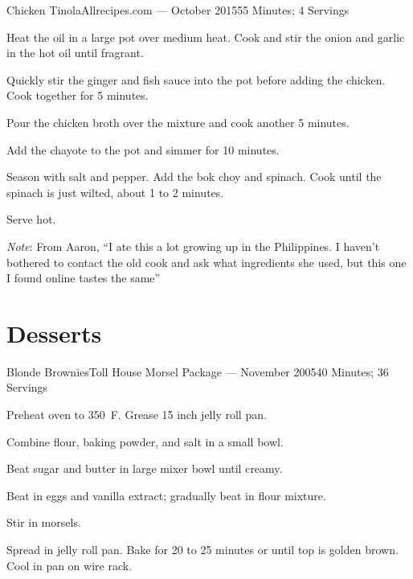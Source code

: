 \documentclass{article}
\begin{document}
\begin{recipe}{Chicken Tinola}{Allrecipes.com --- October 2015}{55 Minutes; 4 Servings}

    Heat the oil in a large pot over medium heat. Cook and stir the onion and
    garlic in the hot oil until fragrant.

    Quickly stir the ginger and fish sauce into the pot before adding the
    chicken. Cook together for 5 minutes.

    Pour the chicken broth over the mixture and cook another 5 minutes.

    Add the chayote to the pot and simmer for 10 minutes.

    Season with salt and pepper. Add the bok choy and spinach. Cook until the
    spinach is just wilted, about 1 to 2 minutes.

    \newstep
    Serve hot.

    \freeform
    \emph{Note}: From Aaron, ``I ate this a lot growing up in the Philippines. I
    haven't bothered to contact the old cook and ask what ingredients she used,
    but this one I found online tastes the same''


\end{recipe}


\section{Desserts}

\begin{recipe}{Blonde Brownies}{Toll House Morsel Package --- November 2005}{40 Minutes; 36 Servings}

   \newstep
   Preheat oven to 350\ \0F. Grease 15 inch jelly roll pan.

   Combine flour, baking powder, and salt in a small bowl.

   Beat sugar and butter in large mixer bowl until creamy.

   Beat in eggs and vanilla extract; gradually beat in flour mixture.

   Stir in morsels.

   \newstep
   Spread in jelly roll pan.  Bake for 20 to 25 minutes or until top is golden
   brown.  Cool in pan on wire rack.

\end{recipe}
\end{document}
